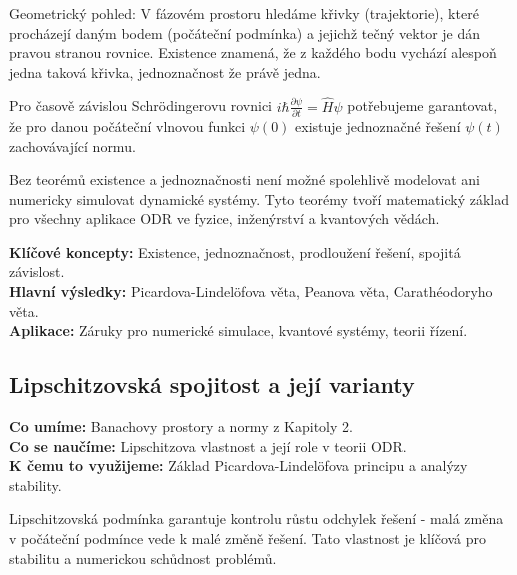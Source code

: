\begin{intuition}
Geometrický pohled: V fázovém prostoru hledáme křivky (trajektorie), které procházejí daným bodem (počáteční podmínka) a jejichž tečný vektor je dán pravou stranou rovnice. Existence znamená, že z každého bodu vychází alespoň jedna taková křivka, jednoznačnost že právě jedna.
\end{intuition}

\begin{example}
Pro časově závislou Schrödingerovu rovnici $i\hbar\frac{\partial\psi}{\partial t} = \hat{H}\psi$ potřebujeme garantovat, že pro danou počáteční vlnovou funkci $\psi(0)$ existuje jednoznačné řešení $\psi(t)$ zachovávající normu.
\end{example}

\begin{keyinsight}
Bez teorémů existence a jednoznačnosti není možné spolehlivě modelovat ani numericky simulovat dynamické systémy. Tyto teorémy tvoří matematický základ pro všechny aplikace ODR ve fyzice, inženýrství a kvantových vědách.
\end{keyinsight}

\begin{summary}
\textbf{Klíčové koncepty:} Existence, jednoznačnost, prodloužení řešení, spojitá závislost. \\
\textbf{Hlavní výsledky:} Picardova-Lindelöfova věta, Peanova věta, Carathéodoryho věta. \\
\textbf{Aplikace:} Záruky pro numerické simulace, kvantové systémy, teorii řízení.
\end{summary}

\spc

\subsection{Lipschitzovská spojitost a její varianty}

\begin{scaffold}
\textbf{Co umíme:} Banachovy prostory a normy z Kapitoly 2. \\
\textbf{Co se naučíme:} Lipschitzova vlastnost a její role v teorii ODR. \\
\textbf{K čemu to využijeme:} Základ Picardova-Lindelöfova principu a analýzy stability.
\end{scaffold}

\begin{motivation}
Lipschitzovská podmínka garantuje kontrolu růstu odchylek řešení - malá změna v počáteční podmínce vede k malé změně řešení. Tato vlastnost je klíčová pro stabilitu a numerickou schůdnost problémů.
\end{motivation}

